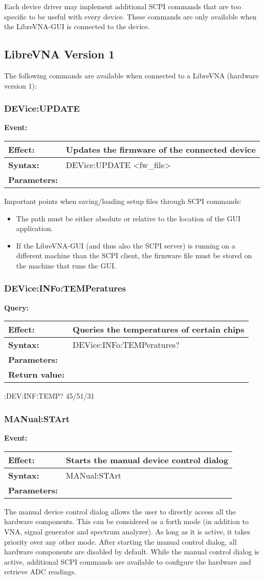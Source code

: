 \documentclass[a4paper,11pt]{article}
\newcommand{\vna}{LibreVNA}
\newcommand{\gui}{\vna{}-GUI}
\newcommand{\event}[3]{
\noindent\textbf{Event:}
\begin{longtable}{p{.15\textwidth} | p{.80\textwidth} } 
\hline
\textbf{Effect:} & #1 \\ \hline
\textbf{Syntax:} & #2 \\ \hline 
\textbf{Parameters:} & \makecell[Xl]{#3} \\ \hline
\end{longtable}
}
\newcommand{\query}[4]{
\noindent\textbf{Query:}
\begin{longtable}{p{.15\textwidth} | p{.80\textwidth} } 
\hline
\textbf{Effect:} & #1 \\ \hline
\textbf{Syntax:} & #2 \\ \hline 
\textbf{Parameters:} & \makecell[tl]{#3} \\ \hline
\textbf{Return value:} & \makecell[tl]{#4} \\ \hline
\end{longtable}
}
\begin{document}
Each device driver may implement additional SCPI commands that are too specific to be useful with every device. These commands are only available when the \gui{} is connected to the device.

\subsection{LibreVNA Version 1}
The following commands are available when connected to a LibreVNA (hardware version 1):

\subsubsection{DEVice:UPDATE}
\event{Updates the firmware of the connected device}{DEVice:UPDATE <fw\_file>}{<fw\_file> Path to the firmware file}
Important points when saving/loading setup files through SCPI commands:
\begin{itemize}
\item The path must be either absolute or relative to the location of the GUI application.
\item If the LibreVNA-GUI (and thus also the SCPI server) is running on a different machine than the SCPI client, the firmware file must be stored on the machine that runs the GUI.
\end{itemize}

\subsubsection{DEVice:INFo:TEMPeratures}
\query{Queries the temperatures of certain chips}{DEVice:INFo:TEMPeratures?}{None}{<source>/<1.LO>/<CPU>}
\begin{example}
:DEV:INF:TEMP?
45/51/31
\end{example}

\subsubsection{MANual:STArt}
\event{Starts the manual device control dialog}{MANual:STArt}{None}

The manual device control dialog allows the user to directly access all the hardware components. This can be considered as a forth mode (in addition to VNA, signal generator and spectrum analyzer). As long as it is active, it takes priority over any other mode. After starting the manual control dialog, all hardware components are disabled by default. While the manual control dialog is active, additional SCPI commands are available to configure the hardware and retrieve ADC readings.
\end{document}
